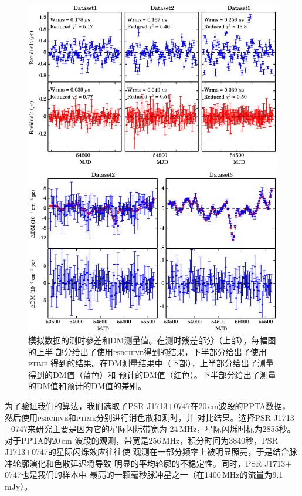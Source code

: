 \begin{figure}
\center
\includegraphics[width=5.5 in]{sim3.ps}
\caption{模拟数据的测时參差和DM测量值。在测时残差部分（上部），每幅图的上半
部分给出了使用\textsc{psrchive}得到的结果，下半部分给出了使用\textsc{ptime}
得到的结果。在DM测量结果中（下部），上半部分给出了测量得到的DM值（蓝色）和
预计的DM值（红色）。下半部分给出了测量的DM值和预计的DM值的差别。}
\label{simTiming}
\end{figure}

为了验证我们的算法，我们选取了PSR J1713$+$0747在20\,cm波段的PPTA数据，
然后使用\textsc{psrchive}和\textsc{ptime}分别进行消色散和测时，并
对比结果。选择PSR J1713$+$0747来研究主要是因为它的星际闪烁带宽为
24\,MHz，星际闪烁时标为2855秒\supercite{Keith13}。对于PPTA的20\,cm
波段的观测，带宽是256\,MHz，积分时间为3840秒，PSR J1713$+$0747的星际闪烁效应往往使
观测在一部分频率上被明显照亮，于是结合脉冲轮廓演化和色散延迟将导致
明显的平均轮廓的不稳定性。同时，PSR J1713$+$0747也是我们的样本中
最亮的一颗毫秒脉冲星之一（在1400\,MHz的流量为9.1\,mJy）。

